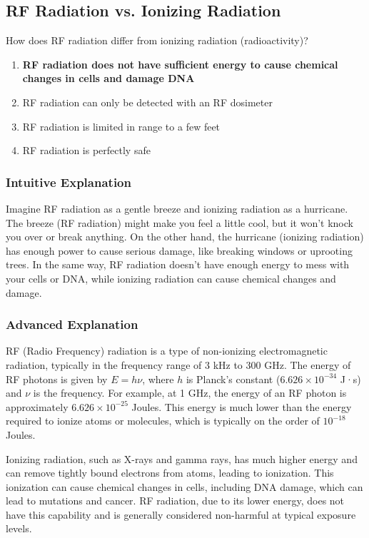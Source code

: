 \subsection{RF Radiation vs. Ionizing Radiation}
\label{T0C12}

\begin{tcolorbox}[colback=gray!10!white,colframe=black!75!black,title=T0C12]
How does RF radiation differ from ionizing radiation (radioactivity)?
\begin{enumerate}[label=\Alph*)]
    \item \textbf{RF radiation does not have sufficient energy to cause chemical changes in cells and damage DNA}
    \item RF radiation can only be detected with an RF dosimeter
    \item RF radiation is limited in range to a few feet
    \item RF radiation is perfectly safe
\end{enumerate}
\end{tcolorbox}

\subsubsection{Intuitive Explanation}
Imagine RF radiation as a gentle breeze and ionizing radiation as a hurricane. The breeze (RF radiation) might make you feel a little cool, but it won’t knock you over or break anything. On the other hand, the hurricane (ionizing radiation) has enough power to cause serious damage, like breaking windows or uprooting trees. In the same way, RF radiation doesn’t have enough energy to mess with your cells or DNA, while ionizing radiation can cause chemical changes and damage.

\subsubsection{Advanced Explanation}
RF (Radio Frequency) radiation is a type of non-ionizing electromagnetic radiation, typically in the frequency range of 3 kHz to 300 GHz. The energy of RF photons is given by \( E = h \nu \), where \( h \) is Planck's constant (\( 6.626 \times 10^{-34} \) J·s) and \( \nu \) is the frequency. For example, at 1 GHz, the energy of an RF photon is approximately \( 6.626 \times 10^{-25} \) Joules. This energy is much lower than the energy required to ionize atoms or molecules, which is typically on the order of \( 10^{-18} \) Joules.

Ionizing radiation, such as X-rays and gamma rays, has much higher energy and can remove tightly bound electrons from atoms, leading to ionization. This ionization can cause chemical changes in cells, including DNA damage, which can lead to mutations and cancer. RF radiation, due to its lower energy, does not have this capability and is generally considered non-harmful at typical exposure levels.

